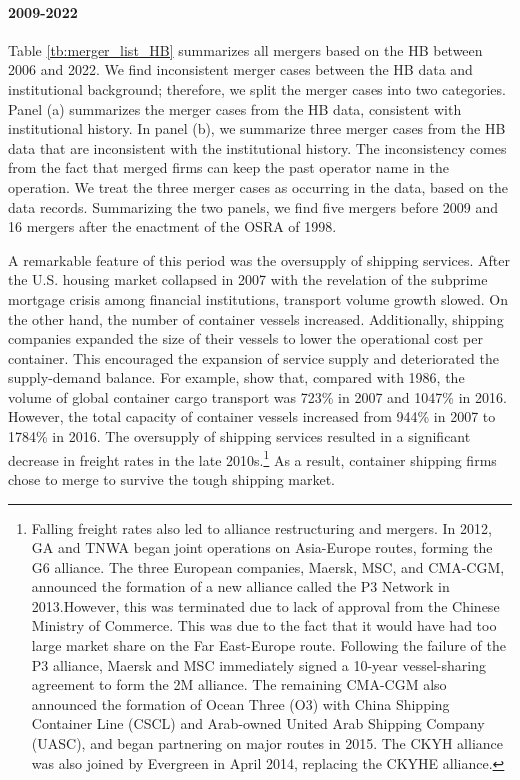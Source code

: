 \documentclass[10pt]{article}
\begin{document}
\paragraph{2009-2022}
Table \ref{tb:merger_list_HB} summarizes all mergers based on the HB between 2006 and 2022. 
We find inconsistent merger cases between the HB data and institutional background; therefore, we split the merger cases into two categories.
Panel (a) summarizes the merger cases from the HB data, consistent with institutional history.
In panel (b), we summarize three merger cases from the HB data that are inconsistent with the institutional history.
The inconsistency comes from the fact that merged firms can keep the past operator name in the operation. 
We treat the three merger cases as occurring in the data, based on the data records.
Summarizing the two panels, we find five mergers before 2009 and 16 mergers after the enactment of the OSRA of 1998.

A remarkable feature of this period was the oversupply of shipping services.
After the U.S. housing market collapsed in 2007 with the revelation of the subprime mortgage crisis among financial institutions, transport volume growth slowed. 
On the other hand, the number of container vessels increased. 
Additionally, shipping companies expanded the size of their vessels to lower the operational cost per container.
This encouraged the expansion of service supply and deteriorated the supply-demand balance.
For example, \cite{matsuda2022} show that, compared with 1986, the volume of global container cargo transport was 723\% in 2007 and 1047\% in 2016. However, the total capacity of container vessels increased from 944\% in 2007 to 1784\% in 2016.
The oversupply of shipping services resulted in a significant decrease in freight rates in the late 2010s.\footnote{Falling freight rates also led to alliance restructuring and mergers. In 2012, GA and TNWA began joint operations on Asia-Europe routes, forming the G6 alliance. 
The three European companies, Maersk, MSC, and CMA-CGM, announced the formation of a new alliance called the P3 Network in 2013.However, this was terminated due to lack of approval from the Chinese Ministry of Commerce. This was due to the fact that it would have had too large market share on the Far East-Europe route. 
Following the failure of the P3 alliance, Maersk and MSC immediately signed a 10-year vessel-sharing agreement to form the 2M alliance. The remaining CMA-CGM also announced the formation of Ocean Three (O3) with China Shipping Container Line (CSCL) and Arab-owned United Arab Shipping Company (UASC), and began partnering on major routes in 2015. The CKYH alliance was also joined by Evergreen in April 2014, replacing the CKYHE alliance.} As a result, container shipping firms chose to merge to survive the tough shipping market.
\end{document}
